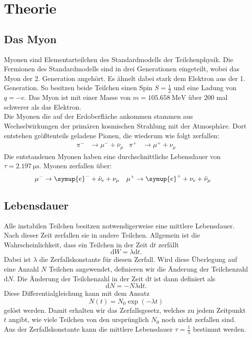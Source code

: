 \section{Theorie}
\label{sec:Theorie}

\subsection{Das Myon}
\label{ssec:myon}

Myonen sind Elementarteilchen des Standardmodells der Teilchenphysik.
Die Fermionen des Standardmodells sind in drei Generationen eingeteilt, wobei das Myon der 2. Generation angehört.
Es ähnelt dabei stark dem Elektron aus der 1. Generation. 
So besitzen beide Teilchen einen Spin $S = \frac{1}{2}$ und eine Ladung von $q = -e$.
Das Myon ist mit einer Masse von $m = \qty{105.658}{\MeV}$ über 200 mal schwerer als das Elektron.
\\
Die Myonen die auf der Erdoberfläche ankommen stammen aus Wechselwirkungen der primären kosmischen Strahlung mit der Atmosphäre.
Dort entstehen größtenteils geladene Pionen, die wiederum wie folgt zerfallen:
\begin{align*}
    \pi^- &\rightarrow \mu^- + \bar{\nu}_{\mu} & \pi^+ &\rightarrow \mu^+ + \nu_{\mu}
\end{align*}
Die entstandenen Myonen haben eine durchschnittliche Lebensdauer von $\tau = \qty{2.197}{\micro\second}$\cite{pdg}.
Myonen zerfallen über:
\begin{align*}
    \mu^- &\rightarrow \symup{e}^- + \bar{\nu}_\text{e} + \nu_{\mu} & \mu^+ &\rightarrow \symup{e}^+ + \nu_{\text{e}} + \bar{\nu}_{\mu}
\end{align*}
\subsection{Lebensdauer}
\label{ssec:lebensdauer}
Alle instabilen Teilchen besitzen notwendigerweise eine mittlere Lebensdauer.
Nach dieser Zeit zerfallen sie in andere Teilchen.
Allgemein ist die Wahrscheinlichkeit, dass ein Teilchen in der Zeit $\text{d}t$ zerfällt 
\begin{equation}
    \text{d}W = \lambda \text{d}t.
\end{equation}
Dabei ist $\lambda$ die Zerfallskonstante für diesen Zerfall.
Wird diese Überlegung auf eine Anzahl $N$ Teilchen angewendet, definieren wir die Änderung der Teilchenzahl $\text{d}N$.
Die Änderung der Teilchenzahl in der Zeit $\text{d}t$ ist dann definiert als
\begin{equation}
    \text{d}N = - N \lambda \text{d}t.
\end{equation}
Diese Differentialgleichung kann mit dem Ansatz 
\begin{equation}
    N(t) = N_0 \exp(- \lambda t)
\end{equation}
gelöst werden.
Damit erhalten wir das Zerfallsgesetz, welches zu jedem Zeitpunkt $t$ angibt, wie viele Teilchen von den ursprünglich $N_0$ noch nicht zerfallen sind.
Aus der Zerfallskonstante kann die mittlere Lebensdauer $\tau = \frac{1}{\lambda}$ bestimmt werden.

